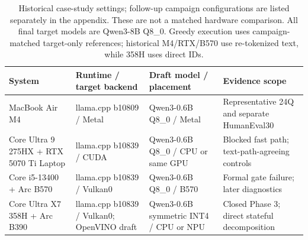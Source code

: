 \begin{table}[t]
\caption{Historical case-study settings; follow-up campaign configurations are listed separately in the appendix. These are not a matched hardware comparison. All final target models are Qwen3-8B Q8\_0. Greedy execution uses campaign-matched target-only references; historical M4/RTX/B570 use re-tokenized text, while 358H uses direct IDs.}
\label{tab:platforms}
\centering
\begin{tabular}{>{\raggedright\arraybackslash}p{1.4in}>{\raggedright\arraybackslash}p{1.65in}>{\raggedright\arraybackslash}p{1.35in}>{\raggedright\arraybackslash}p{1.5in}}
\toprule
System & Runtime / target backend & Draft model / placement & Evidence scope \\
\midrule
MacBook Air M4 & llama.cpp b10809 / Metal & Qwen3-0.6B Q8\_0 / Metal & Representative 24Q and separate HumanEval30 \\
Core Ultra 9 275HX + RTX 5070 Ti Laptop & llama.cpp b10839 / CUDA & Qwen3-0.6B Q8\_0 / CPU or same GPU & Blocked fast path; text-path-agreeing controls \\
Core i5-13400 + Arc B570 & llama.cpp b10839 / Vulkan0 & Qwen3-0.6B Q8\_0 / B570 & Formal gate failure; later diagnostics \\
Core Ultra X7 358H + Arc B390 & llama.cpp b10839 / Vulkan0; OpenVINO draft & Qwen3-0.6B symmetric INT4 / CPU or NPU & Closed Phase 3; direct stateful decomposition \\
\bottomrule
\end{tabular}
\end{table}
